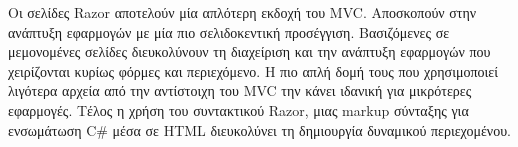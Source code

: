 Οι σελίδες Razor αποτελούν μία απλότερη εκδοχή του MVC. Αποσκοπούν στην ανάπτυξη εφαρμογών με μία πιο
σελιδοκεντική προσέγγιση. Βασιζόμενες σε μεμονομένες σελίδες διευκολύνουν τη διαχείριση και την ανάπτυξη 
εφαρμογών που χειρίζονται κυρίως φόρμες και περιεχόμενο. Η πιο απλή δομή τους που χρησιμοποιεί λιγότερα
αρχεία από την αντίστοιχη του MVC την κάνει ιδανική για μικρότερες εφαρμογές. Τέλος η χρήση του συντακτικού
Razor, μιας markup σύνταξης για ενσωμάτωση C\# μέσα σε HTML διευκολύνει τη δημιουργία δυναμικού περιεχομένου.
